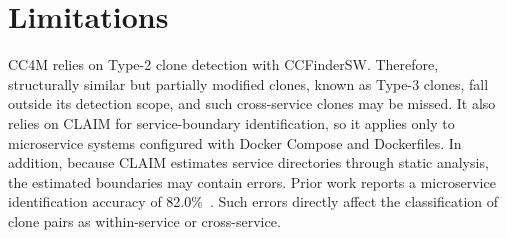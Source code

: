 \documentclass[conference]{IEEEtran}
\begin{document}
%



\section{Limitations}
\label{sec:limitations}

\textsc{CC4M} relies on Type-2 clone detection with CCFinderSW. Therefore, structurally similar but partially modified clones, known as Type-3 clones, fall outside its detection scope, and such cross-service clones may be missed.
It also relies on CLAIM for service-boundary identification, so it
applies only to microservice systems configured with Docker Compose and
Dockerfiles.
In addition, because CLAIM estimates service
directories through static analysis, the estimated boundaries may
contain errors. Prior work reports a microservice identification
accuracy of 82.0\%~\cite{Maggi2024CLAIM}. Such errors directly affect
the classification of clone pairs as within-service or cross-service.
\end{document}
